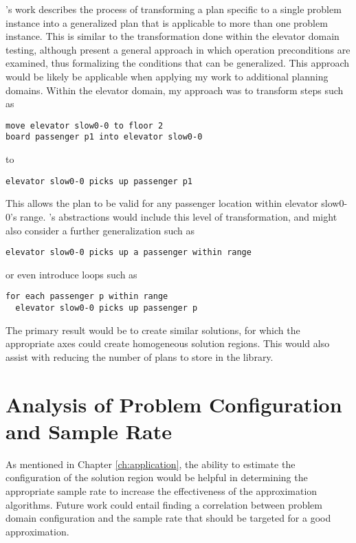 
\cite{srivastava08generalized}'s work describes the process of transforming a plan specific to a single problem instance into a generalized plan that is applicable to more than one problem instance.  This is similar to the transformation done within the elevator domain testing, although \citeauthor{srivastava08generalized} present a general approach in which operation preconditions are examined, thus formalizing the conditions that can be generalized.  This approach would be likely be applicable when applying my work to additional planning domains.  Within the elevator domain, my approach was to transform steps such as 

\begin{verbatim}
move elevator slow0-0 to floor 2
board passenger p1 into elevator slow0-0
\end{verbatim}

\noindent
to 

\begin{verbatim}
elevator slow0-0 picks up passenger p1
\end{verbatim}

\noindent
This allows the plan to be valid for any passenger location within elevator slow0-0's range.  \citeauthor{srivastava08generalized}'s abstractions would include this level of transformation, and might also consider a further generalization such as 

\begin{verbatim}
elevator slow0-0 picks up a passenger within range
\end{verbatim}

\noindent
or even introduce loops such as

\begin{verbatim}
for each passenger p within range
  elevator slow0-0 picks up passenger p
\end{verbatim}

The primary result would be to create similar solutions, for which the appropriate axes could create homogeneous solution regions.  This would also assist with reducing the number of plans to store in the library.

\section{Analysis of Problem Configuration and Sample Rate}
As mentioned in Chapter \ref{ch:application}, the ability to estimate the configuration of the solution region would be helpful in determining the appropriate sample rate to increase the effectiveness of the approximation algorithms.  Future work could entail finding a correlation between problem domain configuration and the sample rate that should be targeted for a good approximation.

